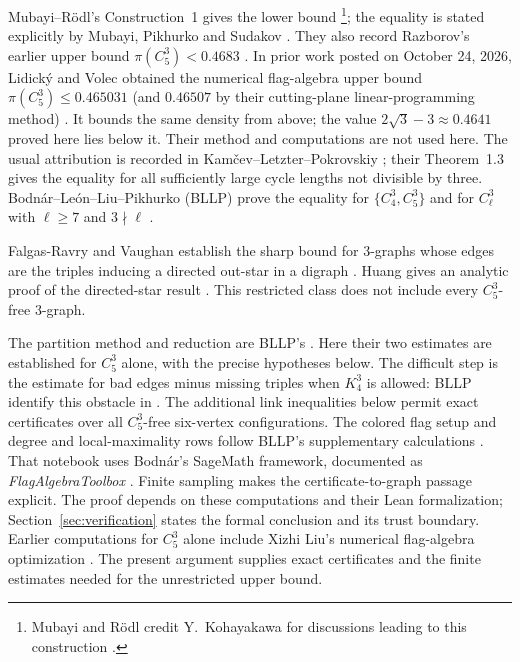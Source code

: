\documentclass[11pt]{article}
\newcommand{\Cfive}{C_5^3}
\begin{document}
Mubayi--R\"odl's Construction~1 gives the lower bound
\cite[Construction~1]{MR}\footnote{Mubayi and R\"odl credit Y.~Kohayakawa
for discussions leading to this construction \cite[\S7]{MR}.}; the equality is stated explicitly by
Mubayi, Pikhurko and Sudakov \cite[\S2.4, Conjecture~7]{MPS}.
They also record Razborov's earlier upper bound
$\pi(\Cfive)<0.4683$ \cite[\S2.4]{MPS,RazborovBound}.
In prior work posted on October 24, 2026, Lidick\'y and Volec
obtained the numerical flag-algebra upper bound $\pi(\Cfive)\le0.465031$
(and $0.46507$ by their cutting-plane linear-programming method)
\cite[\S6]{LV}. It bounds the same density from above; the value
$2\sqrt3-3\approx0.4641$ proved here lies below it. Their method and
computations are not used here.
The usual attribution is recorded in
Kam\v{c}ev--Letzter--Pokrovskiy \cite[Conjecture~1.1]{KLP};
their Theorem~1.3 gives the equality for all sufficiently large cycle
lengths not divisible by three.
Bodn\'ar--Le\'on--Liu--Pikhurko (BLLP) prove the equality for
$\{C_4^3,C_5^3\}$ and for $C_\ell^3$ with $\ell\ge7$ and
$3\nmid\ell$ \cite[Theorem~1.1]{BLLP}.

Falgas-Ravry and Vaughan establish the sharp bound for $3$-graphs
whose edges are the triples inducing a directed out-star in a digraph
\cite[\S3.1, Proposition~25 and Theorem~27]{FRV}.
Huang gives an analytic proof of the directed-star result
\cite[\S\S2 and~4]{Huang}. This restricted class does not include every
$\Cfive$-free $3$-graph.

The partition method and reduction are BLLP's
\cite[Propositions~3.2--3.3, Lemma~4.1 and the proof of Theorem~2.4]{BLLP}.
Here their two estimates are established for $\Cfive$ alone, with the
precise hypotheses below. The difficult step is the estimate for bad
edges minus missing triples when $K_4^3$ is allowed: BLLP identify this
obstacle in \cite[\S7]{BLLP}. The additional link inequalities below
permit exact certificates over all $\Cfive$-free six-vertex configurations.
The colored flag setup and degree and local-maximality rows follow
BLLP's supplementary calculations \cite[notebook, zero-based code cells~1 and~4]{BLLPdata}.
That notebook uses Bodn\'ar's SageMath framework, documented as
\emph{FlagAlgebraToolbox} \cite[\S\S1.2 and~2.4]{Toolbox}.
Finite sampling makes the certificate-to-graph passage explicit.
The proof depends on these computations and their Lean formalization;
Section~\ref{sec:verification} states the formal conclusion and its trust boundary.
Earlier computations for $\Cfive$ alone include Xizhi Liu's numerical
flag-algebra optimization \cite[edge-density objective and saved output]{LiuNotebook}.
The present argument supplies exact certificates and the finite estimates
needed for the unrestricted upper bound.
\end{document}
